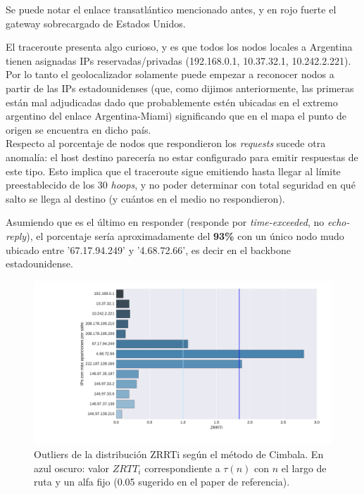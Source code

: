 Se puede notar el enlace transatlántico mencionado antes, y en rojo fuerte el gateway sobrecargado de Estados Unidos.

El traceroute presenta algo curioso, y es que todos los nodos locales a Argentina tienen asignadas IPs reservadas/privadas (192.168.0.1, 10.37.32.1, 10.242.2.221). Por lo tanto el geolocalizador solamente puede empezar a reconocer nodos a partir de las IPs estadounidenses (que, como dijimos anteriormente, las primeras están mal adjudicadas dado que probablemente estén ubicadas en el extremo argentino del enlace Argentina-Miami) significando que en el mapa el punto de origen se encuentra en dicho país. \\

Respecto al porcentaje de nodos que respondieron los \emph{requests} sucede otra anomalía: el host destino parecería no estar configurado para emitir respuestas de este tipo. Esto implica que el traceroute sigue emitiendo hasta llegar al límite preestablecido de los 30 \emph{hoops}, y no poder determinar con total seguridad en qué salto se llega al destino (y cuántos en el medio no respondieron).

Asumiendo que es el último en responder (responde por \emph{time-exceeded}, no \emph{echo-reply}), el porcentaje sería aproximadamente del \textbf{93\%} con un único nodo mudo ubicado entre '67.17.94.249' y '4.68.72.66', es decir en el backbone estadounidense.



\begin{figure}[H]
   \centering
       \includegraphics[width=1\textwidth, height=1\textheight, keepaspectratio]{../img/lan-zrtt}
 \caption{Outliers de la distribución ZRRTi según el método de Cimbala. En azul oscuro: valor $ZRTT_i$ correspondiente a $\tau(n)$ con $n$ el largo de ruta y un alfa fijo (0.05 sugerido en el paper de referencia).}
 \label{fig:lan-zrtt}
\end{figure}

